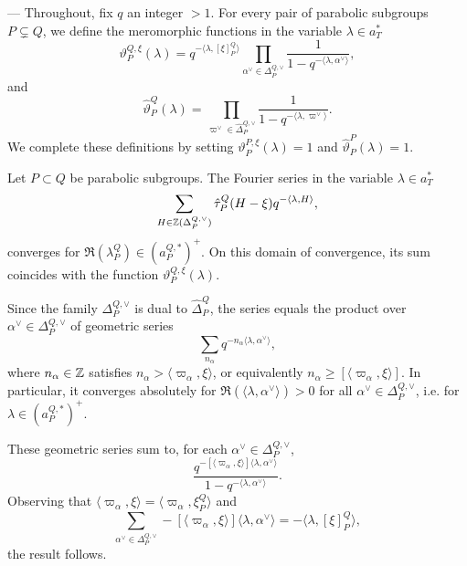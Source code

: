 \begin{paragr} --- Throughout, fix $q$ an integer $>1$. For every pair of parabolic subgroups $P\subsetneq Q$, we define the meromorphic functions in the variable $\lambda\in a_T^*$
\begin{equation}
  \label{eq:vartheta}
  \vartheta_P^{Q,\xi}(\lambda)=q^{-\langle \lambda, [\xi]_P^Q\rangle} \prod_{\alpha^\vee \in \Delta_P^{Q,\vee}} \frac{1}{1-q^{-\langle \lambda,\alpha^\vee\rangle}},
\end{equation}
and 
\begin{equation}
  \label{eq:varthetac}
  \hat{\vartheta}_P^{Q}(\lambda)=\prod_{\varpi^\vee \in \hat{\Delta}_P^{Q,\vee}} \frac{1 }{1-q^{-\langle \lambda,\varpi^\vee\rangle}}.
\end{equation}
We complete these definitions by setting $\vartheta_P^{P,\xi}(\lambda)=1$ and $\hat{\vartheta}_P^{P}(\lambda)=1$.

\begin{lemme}
  Let $P\subset Q$ be parabolic subgroups. The Fourier series in the variable $\lambda\in a_T^*$
$$\sum_{H\in \mathbb{Z}(\Delta_P^{Q,\vee}) }\hat{\tau}_P^Q(H-\xi) q^{-\langle\lambda, H  \rangle},$$
converges for $\Re(\lambda_P^Q)\in (a_P^{Q,*})^+$. On this domain of convergence, its sum coincides with the function $\vartheta_P^{Q,\xi}(\lambda)$.
\end{lemme}

\begin{preuve}
Since the family $\Delta_P^{Q,\vee}$ is dual to $\hat{\Delta}_P^{Q}$, the series equals the product over $\alpha^\vee \in \Delta_P^{Q,\vee}$ of geometric series
$$\sum_{n_\alpha} q^{-n_\alpha \langle\lambda,\alpha^\vee\rangle},$$
where $n_\alpha\in \mathbb{Z}$ satisfies $n_\alpha > \langle \varpi_\alpha, \xi \rangle$, or equivalently $n_\alpha \geq [\langle \varpi_\alpha, \xi \rangle]$. In particular, it converges absolutely for $\Re(\langle\lambda,\alpha^\vee\rangle)>0$ for all $\alpha^\vee \in \Delta_P^{Q,\vee}$, i.e. for $\lambda \in  (a_P^{Q,*})^+$. 

These geometric series sum to, for each $\alpha^\vee \in \Delta_P^{Q,\vee}$,
$$\frac{q^{- [\langle \varpi_\alpha, \xi \rangle] \langle\lambda,\alpha^\vee\rangle}}{1-q^{-\langle \lambda,\alpha^\vee\rangle}}.$$
Observing that $\langle \varpi_\alpha, \xi \rangle=\langle \varpi_\alpha, \xi_P^Q \rangle$ and
$$\sum_{\alpha^\vee \in \Delta_P^{Q,\vee}} - [\langle \varpi_\alpha, \xi \rangle] \langle\lambda,\alpha^\vee\rangle =-\langle \lambda, [\xi]_P^Q\rangle,$$
the result follows.
\end{preuve}


\end{paragr}
